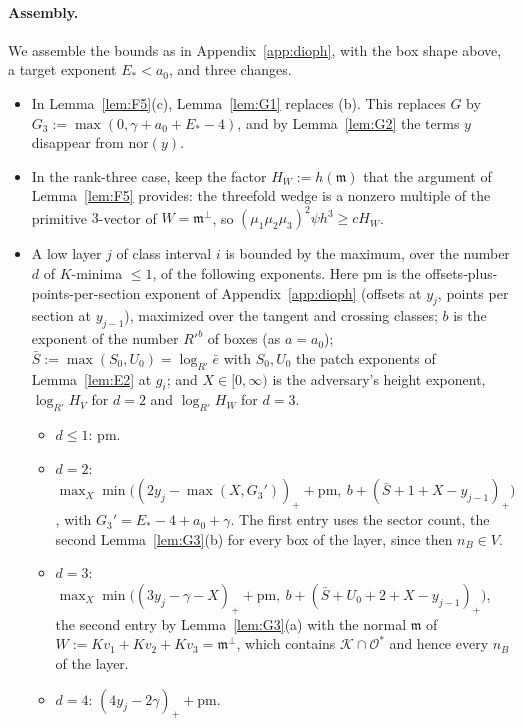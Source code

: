 \documentclass[aps,prx,twocolumn,superscriptaddress,nofootinbib,longbibliography]{revtex4-2}
\theoremstyle{plain}
\theoremstyle{definition}
\theoremstyle{remark}
\begin{document}
\paragraph{Assembly.} We assemble the bounds as in Appendix~\ref{app:dioph}, with the box shape above, a target exponent $E_*<a_0$, and three changes.
\begin{itemize}\setlength\itemsep{0pt}
\item In Lemma~\ref{lem:F5}(c), Lemma~\ref{lem:G1} replaces (b). This replaces $G$ by
$G_3:=\max(0,\gamma+a_0+E_*-4)$, and by Lemma~\ref{lem:G2} the terms $y$ disappear from $\mathrm{nor}(y)$.
\item In the rank-three case, keep the factor $H_W:=h(\mathfrak m)$ that the argument of
Lemma~\ref{lem:F5} provides: the threefold wedge is a nonzero multiple of the primitive $3$-vector of
$W=\mathfrak m^\perp$, so $(\mu_1\mu_2\mu_3)^2\psi h^3\ge cH_W$.
\item A low layer $j$ of class interval $i$ is bounded by the maximum, over the number $d$ of $K$-minima
$\le1$, of the following exponents. Here $\mathrm{pm}$ is the offsets-plus-points-per-section exponent of
Appendix~\ref{app:dioph} (offsets at $y_j$, points per section at $y_{j-1}$), maximized over the tangent and crossing classes; $b$ is the exponent of the number $R'^b$ of boxes (as $a=a_0$); $\bar S:=\max(S_0,U_0)=\log_{R'}\bar e$ with $S_0,U_0$ the patch exponents of Lemma~\ref{lem:E2} at $g_i$; and $X\in[0,\infty)$ is the adversary's height exponent, $\log_{R'}H_V$ for $d=2$ and $\log_{R'}H_W$ for $d=3$.
\begin{itemize}\setlength\itemsep{0pt}
\item $d\le1$: $\mathrm{pm}$.
\item $d=2$: $\max_X\min\big((2y_j-\max(X,G_3'))_++\mathrm{pm},\ b+(\bar S+1+X-y_{j-1})_+\big)$, with
$G_3'=E_*-4+a_0+\gamma$. The first entry uses the sector count, the second Lemma~\ref{lem:G3}(b) for every
box of the layer, since then $n_B\in V$.
\item $d=3$: $\max_X\min\big((3y_j-\gamma-X)_++\mathrm{pm},\ b+(\bar S+U_0+2+X-y_{j-1})_+\big)$, the
second entry by Lemma~\ref{lem:G3}(a) with the normal $\mathfrak m$ of $W:=Kv_1+Kv_2+Kv_3=\mathfrak m^\perp$, which contains $\mathcal K\cap\mathcal O^*$ and hence every $n_B$ of the layer.
\item $d=4$: $(4y_j-2\gamma)_++\mathrm{pm}$.
\end{itemize}
\end{itemize}
\end{document}
